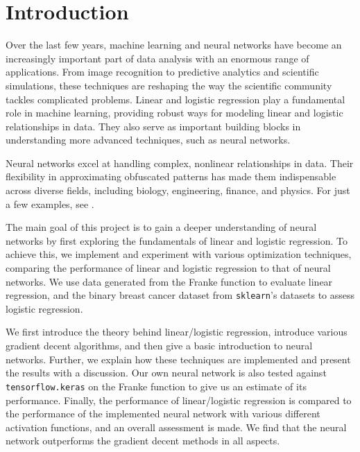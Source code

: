 \documentclass[%
reprint,s
amsmath,amssymb,
aps,
]{revtex4-2}
\begin{document}
\section{Introduction}
Over the last few years, machine learning and neural networks have become an increasingly important part of data analysis with an enormous range of applications. From image recognition to predictive analytics and scientific simulations, these techniques are reshaping the way the scientific community tackles complicated problems. Linear and logistic regression play a fundamental role in machine learning, providing robust ways for modeling linear and logistic relationships in data. They also serve as important building blocks in understanding more advanced techniques, such as neural networks. 

Neural networks excel at handling complex, nonlinear relationships in data. Their flexibility in approximating obfuscated patterns has made them indispensable across diverse fields, including biology, engineering, finance, and physics. For just a few examples, see \cite{dawid2023modernapplicationsmachinelearning,thapar2023applicationsmachinelearningmodelling,mohammadi2022applicationsmachinelearninghealthcare}.

The main goal of this project is to gain a deeper understanding of neural networks by first exploring the fundamentals of linear and logistic regression. To achieve this, we implement and experiment with various optimization techniques, comparing the performance of linear and logistic regression to that of neural networks. We use data generated from the Franke function to evaluate linear regression, and the binary breast cancer dataset from \texttt{sklearn}'s datasets \cite{sklearn} to assess logistic regression. 

We first introduce the theory behind linear/logistic regression, introduce various gradient decent algorithms, and then give a basic introduction to neural networks. Further, we explain how these techniques are implemented and present the results with a discussion. Our own neural network is also tested against \texttt{tensorflow.keras} \cite{tensorflow2015-whitepaper} on the Franke function to give us an estimate of its performance. Finally, the performance of linear/logistic regression is compared to the performance of the implemented neural network with various different activation functions, and an overall assessment is made. We find that the neural network outperforms the gradient decent methods in all aspects.
\end{document}

